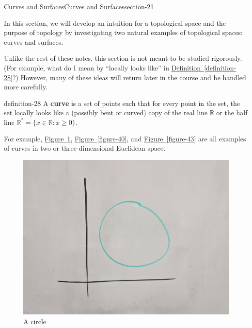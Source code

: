 \documentclass[oneside,10pt,]{article}
\newcommand{\terminology}[1]{\textbf{#1}}
\begin{document}
\begin{sectionptx}{Curves and Surfaces}{}{Curves and Surfaces}{}{}{section-21}
\begin{introduction}{}%
\hypertarget{p-24}{}%
In this section, we will develop an intuition for a topological space and the purpose of topology by investigating two natural examples of topological spaces: curves and surfaces.%
\par
\hypertarget{p-25}{}%
Unlike the rest of these notes, this section is not meant to be studied rigorously. (For example, what do I mean by ``locally looks like'' in \hyperref[definition-28]{Definition~\ref{definition-28}}?)  However, many of these ideas will return later in the course and be handled more carefully.%
\end{introduction}%
\begin{definition}{}{definition-28}%
\hypertarget{p-29}{}%
A \terminology{curve} is a set of points such that for every point in the set, the set locally looks like a (possibly bent or curved) copy of the real line \(\mathbb R\) or the half line \(\mathbb R^*=\{x\in\mathbb R:x\geq 0\}\).%
\end{definition}
\hypertarget{p-33}{}%
For example, \hyperref[figure-37]{Figure~\ref{figure-37}}, \hyperref[figure-40]{Figure~\ref{figure-40}}, and \hyperref[figure-43]{Figure~\ref{figure-43}} are all examples of curves in two or three-dimensional Euclidean space.%
\begin{figure}
\centering
\includegraphics[width=1\linewidth]{images/circle.jpg}
\caption{A circle\label{figure-37}}
\end{figure}
\begin{figure}

\end{figure}
\end{sectionptx}
\end{document}
